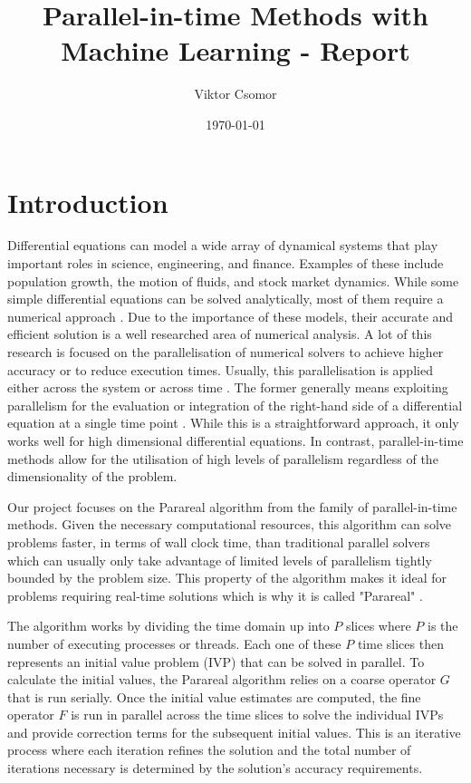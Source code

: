 \documentclass{article}
\begin{document}

\title{Parallel-in-time Methods with Machine Learning - Report}
\author{Viktor Csomor}
\date{\today}

\makeEPCCtitle

\newpage

\tableofcontents

\newpage
{}

\section{Introduction}

Differential equations can model a wide array of dynamical systems that play important roles in science, engineering, and finance. Examples of these include population growth, the motion of fluids, and stock market dynamics. While some simple differential equations can be solved analytically, most of them require a numerical approach \cite[p.~310]{suli2003}. Due to the importance of these models, their accurate and efficient solution is a well researched area of numerical analysis. A lot of this research is focused on the parallelisation of numerical solvers to achieve higher accuracy or to reduce execution times. Usually, this parallelisation is applied either across the system or across time \cite{gear1988}. The former generally means exploiting parallelism for the evaluation or integration of the right-hand side of a differential equation at a single time point \cite[p.~1-2]{solodushkin2016}. While this is a straightforward approach, it only works well for high dimensional differential equations. In contrast, parallel-in-time methods allow for the utilisation of high levels of parallelism regardless of the dimensionality of the problem.

Our project focuses on the Parareal algorithm \cite{Parareal} from the family of parallel-in-time methods. Given the necessary computational resources, this algorithm can solve problems faster, in terms of wall clock time, than traditional parallel solvers which can usually only take advantage of limited levels of parallelism tightly bounded by the problem size. This property of the algorithm makes it ideal for problems requiring real-time solutions which is why it is called "Parareal" \cite[p.~3]{staff2003}.

The algorithm works by dividing the time domain up into $P$ slices where $P$ is the number of executing processes or threads. Each one of these $P$ time slices then represents an initial value problem (IVP) that can be solved in parallel. To calculate the initial values, the Parareal algorithm relies on a coarse operator $G$ that is run serially. Once the initial value estimates are computed, the fine operator $F$ is run in parallel across the time slices to solve the individual IVPs and provide correction terms for the subsequent initial values. This is an iterative process where each iteration refines the solution and the total number of iterations necessary is determined by the solution's accuracy requirements.
\end{document}
